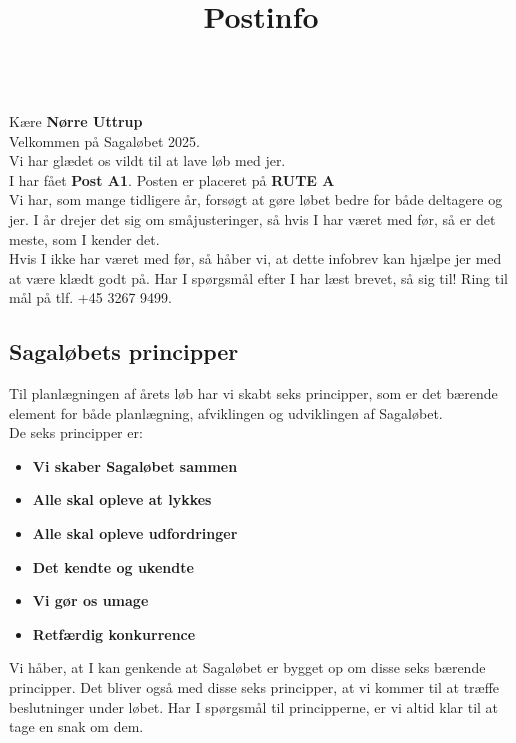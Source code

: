 \title{Postinfo}\\
Kære \textbf{Nørre Uttrup}\\
\newline
Velkommen på Sagaløbet 2025.\\
Vi har glædet os vildt til at lave løb med jer.\\
\newline
I har fået \textbf{Post A1}. Posten er placeret på \textbf{RUTE A}\\
Vi har, som mange tidligere år, forsøgt at gøre løbet bedre for både deltagere og jer. I år drejer det sig om småjusteringer, så hvis I har været med før, så er det meste, som I kender det.\\
\newline
Hvis I ikke har været med før, så håber vi, at dette infobrev kan hjælpe jer med at være klædt godt på. Har I spørgsmål efter I har læst brevet, så sig til! Ring til mål på tlf. +45 3267 9499.
\subsection{Sagaløbets principper}
Til planlægningen af årets løb har vi skabt seks principper, som er det bærende element for både planlægning, afviklingen og udviklingen af Sagaløbet.\\
De seks principper er:
\begin{itemize}
  \item \textbf{Vi skaber Sagaløbet sammen}
  \item \textbf{Alle skal opleve at lykkes}
  \item \textbf{Alle skal opleve udfordringer}
  \item \textbf{Det kendte og ukendte}
  \item \textbf{Vi gør os umage}
  \item \textbf{Retfærdig konkurrence}
\end{itemize}
Vi håber, at I kan genkende at Sagaløbet er bygget op om disse seks bærende principper. Det bliver også med disse seks principper, at vi kommer til at træffe beslutninger under løbet. Har I spørgsmål til principperne, er vi altid klar til at tage en snak om dem.
